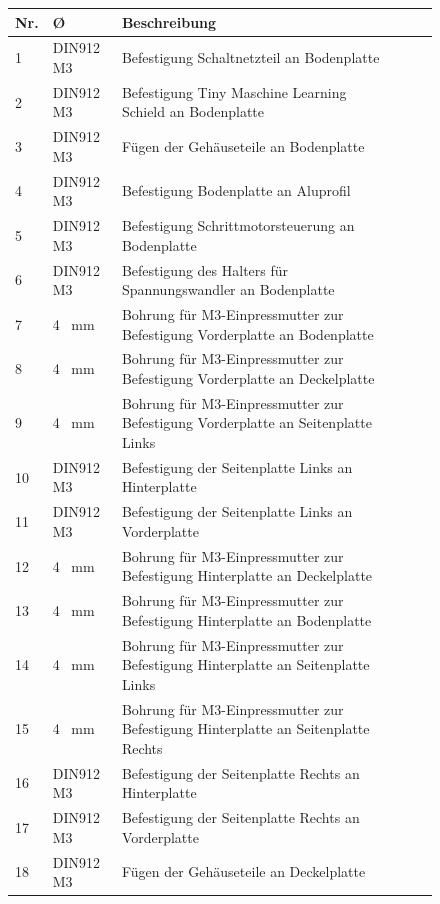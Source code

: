 	
	\begin{figure}[H]
		\begin{center}
			\fontsize{8}{10}\selectfont
			\begin{tabularx}{\textwidth}{|p{0.4cm}|p{1.2cm}|X|X|X|X|} 
				\hline 
				\textbf{Nr.} & \textbf{\O} & \textbf{Beschreibung} \\ \hline
				1 & DIN912 M3 & Befestigung Schaltnetzteil an Bodenplatte \\ \hline
				2 & DIN912 M3 & Befestigung Tiny Maschine Learning Schield an Bodenplatte \\ \hline
				3 & DIN912 M3 & Fügen der Gehäuseteile an Bodenplatte  \\ \hline
				4 & DIN912 M3 & Befestigung Bodenplatte an Aluprofil \\ \hline
				5 & DIN912 M3 & Befestigung Schrittmotorsteuerung an Bodenplatte \\ \hline
				6 & DIN912 M3 & Befestigung des Halters für Spannungswandler an Bodenplatte \\ \hline
				7 & 4 \ mm & Bohrung für M3-Einpressmutter zur Befestigung Vorderplatte an Bodenplatte \\ \hline
				8 & 4 \ mm & Bohrung für M3-Einpressmutter zur Befestigung Vorderplatte an Deckelplatte \\ \hline
				9 & 4 \ mm & Bohrung für M3-Einpressmutter zur Befestigung Vorderplatte an Seitenplatte Links \\ \hline
				10& DIN912 M3 & Befestigung der Seitenplatte Links an Hinterplatte \\ \hline
				11& DIN912 M3 & Befestigung der Seitenplatte Links an Vorderplatte \\ \hline
				12& 4 \ mm & Bohrung für M3-Einpressmutter zur Befestigung Hinterplatte an Deckelplatte \\ \hline
				13& 4 \ mm & Bohrung für M3-Einpressmutter zur Befestigung Hinterplatte an Bodenplatte \\ \hline
				14& 4 \ mm & Bohrung für M3-Einpressmutter zur Befestigung Hinterplatte an Seitenplatte Links \\ \hline
				15& 4 \ mm & Bohrung für M3-Einpressmutter zur Befestigung Hinterplatte an Seitenplatte Rechts \\ \hline
				16& DIN912 M3 & Befestigung der Seitenplatte Rechts an Hinterplatte \\ \hline
				17& DIN912 M3 & Befestigung der Seitenplatte Rechts an Vorderplatte \\ \hline
				18& DIN912 M3 & Fügen der Gehäuseteile an Deckelplatte \\ \hline
			\end{tabularx}
				\label{BohrungenGK}
		\end{center}
	\end{figure}

